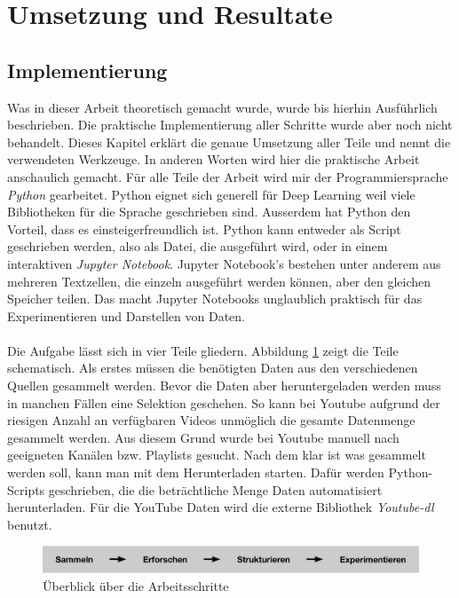 \section{Umsetzung und Resultate}

\subsection{Implementierung}

Was in dieser Arbeit theoretisch gemacht wurde, wurde bis hierhin Ausführlich beschrieben. Die praktische Implementierung aller Schritte wurde aber noch nicht behandelt. Dieses Kapitel erklärt die genaue Umsetzung aller Teile und nennt die verwendeten Werkzeuge. In anderen Worten wird hier die praktische Arbeit anschaulich gemacht.
Für alle Teile der Arbeit wird mir der Programmiersprache \textit{Python}  gearbeitet. Python eignet sich generell für Deep Learning weil viele Bibliotheken für die Sprache geschrieben sind. Ausserdem hat Python den Vorteil, dass es einsteigerfreundlich ist. Python kann entweder als Script geschrieben werden, also als Datei, die ausgeführt wird, oder in einem interaktiven \textit{Jupyter Notebook}\parencite{jupyter}. Jupyter Notebook's  bestehen unter anderem aus mehreren Textzellen, die einzeln ausgeführt werden können, aber den gleichen Speicher teilen. Das macht Jupyter Notebooks unglaublich praktisch für das Experimentieren und Darstellen von Daten.
\\ \\
Die Aufgabe lässt sich in vier Teile gliedern. Abbildung \ref{img:vorgehen} zeigt die Teile schematisch. 
Als erstes müssen die benötigten Daten aus den verschiedenen Quellen gesammelt werden. Bevor die Daten aber heruntergeladen werden muss in manchen Fällen eine Selektion geschehen. So kann bei Youtube aufgrund der riesigen Anzahl an verfügbaren Videos unmöglich die gesamte Datenmenge gesammelt werden. Aus diesem Grund wurde bei Youtube manuell nach geeigneten Kanälen bzw. Playlists gesucht. Nach dem klar ist was gesammelt werden soll, kann man mit dem Herunterladen starten. Dafür werden Python-Scripts geschrieben, die die beträchtliche Menge Daten automatisiert herunterladen. Für die YouTube Daten wird die externe Bibliothek \textit{Youtube-dl}\parencite{youtube-dl} benutzt.

 \begin{figure}[hbt]
	\centering
		\includegraphics[width=1.0\textwidth]{assets/vorgang_small.png}
	\caption{Überblick über die Arbeitsschritte}
	\label{img:vorgehen}
\end{figure}

